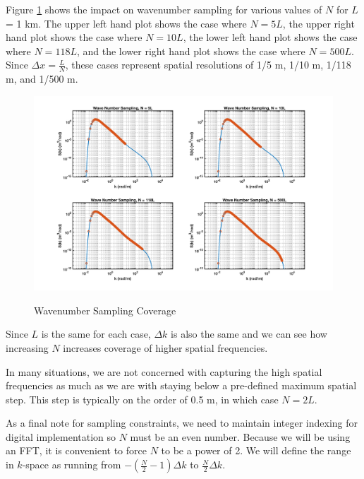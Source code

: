 Figure \ref{os_fig:6aa} shows the impact on wavenumber sampling for various values of $N$ for $L$ = 1 km. The upper left hand plot shows the case where $N = 5L$, the upper right hand plot shows the case where $N = 10L$, the lower left hand plot shows the case where $N = 118L$, and the lower right hand plot shows the case where $N = 500L$. Since $\Delta x = \frac{L}{N}$, these cases represent spatial resolutions of 1/5 m, 1/10 m, 1/118 m, and 1/500 m. 
\begin{figure}[H]
  \begin{center}
\includegraphics[width=6in]{../media/Ocean_Surface/sampling_coverage.png}
  \end{center}
  \renewcommand{\baselinestretch}{1} \small\normalsize
  \begin{quote}
    \caption[Wavenumber Sampling Coverage]{Wavenumber Sampling Coverage\label{os_fig:6aa}}
  \end{quote}
\end{figure}
\renewcommand{\baselinestretch}{2} \small\normalsize
Since $L$ is the same for each case, $\Delta k$ is also the same and we can see how increasing $N$ increases coverage of higher spatial frequencies.

In many situations, we are not concerned with capturing the high spatial frequencies as much as we are with staying below a pre-defined maximum spatial step. This step is typically on the order of 0.5 m, in which case $N = 2L$.

As a final note for sampling constraints, we need to maintain integer indexing for digital implementation so $N$ must be an even number. Because we will be using an FFT, it is convenient to force $N$ to be a power of 2. We will define the range in $k$-space as running from $-\left(\frac{N}{2}-1\right)\Delta k$ to $\frac{N}{2}\Delta k$.

